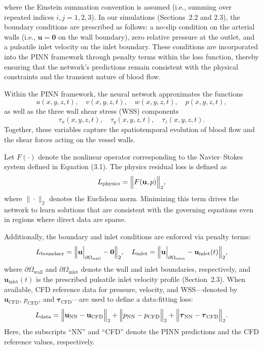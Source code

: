 \documentclass[12pt, a4paper]{article}
\begin{document}
where the Einstein summation convention is assumed (i.e., summing over repeated indices \(i,j = 1,2,3\)). In our simulations (Sections~2.2 and 2.3), the boundary conditions are prescribed as follows: a no-slip condition on the arterial walls (i.e., \(\mathbf{u} = \mathbf{0}\) on the wall boundary), zero relative pressure at the outlet, and a pulsatile inlet velocity on the inlet boundary. These conditions are incorporated into the PINN framework through penalty terms within the loss function, thereby ensuring that the network’s predictions remain consistent with the physical constraints and the transient nature of blood flow.

Within the PINN framework, the neural network approximates the functions
\[
u(x,y,z,t),\quad v(x,y,z,t),\quad w(x,y,z,t),\quad p(x,y,z,t),
\]
as well as the three wall shear stress (WSS) components
\[
\tau_x(x,y,z,t),\quad \tau_y(x,y,z,t),\quad \tau_z(x,y,z,t).
\]
Together, these variables capture the spatiotemporal evolution of blood flow and the shear forces acting on the vessel walls.

Let \(F(\cdot)\) denote the nonlinear operator corresponding to the Navier–Stokes system defined in Equation (3.1). The physics residual loss is defined as
\[
L_{\mathrm{physics}} = \Bigl\|F(\mathbf{u},p)\Bigr\|_2,
\]
where \(\|\cdot\|_2\) denotes the Euclidean norm. Minimizing this term drives the network to learn solutions that are consistent with the governing equations even in regions where direct data are sparse.

Additionally, the boundary and inlet conditions are enforced via penalty terms:
\[
L_{\mathrm{boundary}} = \Bigl\|\mathbf{u}\Big|_{\partial\Omega_{\mathrm{wall}}} - \mathbf{0}\Bigr\|_2, \quad
L_{\mathrm{inlet}} = \Bigl\|\mathbf{u}\Big|_{\partial\Omega_{\mathrm{inlet}}} - \mathbf{u}_{\mathrm{inlet}}(t)\Bigr\|_2,
\]
where \(\partial\Omega_{\mathrm{wall}}\) and \(\partial\Omega_{\mathrm{inlet}}\) denote the wall and inlet boundaries, respectively, and \(\mathbf{u}_{\mathrm{inlet}}(t)\) is the prescribed pulsatile inlet velocity profile (Section~2.3). When available, CFD reference data for pressure, velocity, and WSS—denoted by \(\mathbf{u}_{\mathrm{CFD}},\,p_{\mathrm{CFD}}\), and \(\boldsymbol{\tau}_{\mathrm{CFD}}\)—are used to define a data-fitting loss:
\[
L_{\mathrm{data}} = \Bigl\|\mathbf{u}_{\mathrm{NN}} - \mathbf{u}_{\mathrm{CFD}}\Bigr\|_2 + \Bigl\|p_{\mathrm{NN}} - p_{\mathrm{CFD}}\Bigr\|_2 + \Bigl\|\boldsymbol{\tau}_{\mathrm{NN}} - \boldsymbol{\tau}_{\mathrm{CFD}}\Bigr\|_2.
\]
Here, the subscripts “NN” and “CFD” denote the PINN predictions and the CFD reference values, respectively.
\end{document}
